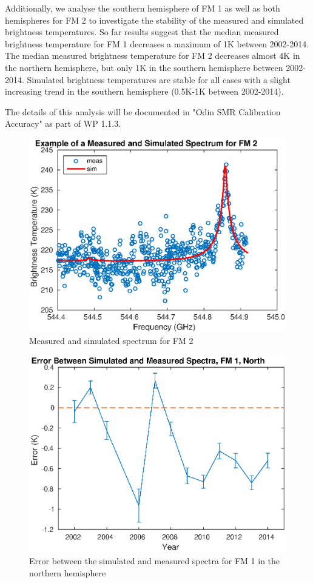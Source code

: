 \begin{itemize}
Additionally, we analyse the southern hemisphere of FM 1 as well as both hemispheres for FM 2 to investigate the stability of the measured and simulated brightness temperatures. So far results suggest that the median measured brightness temperature for FM 1 decreases a maximum of 1K between 2002-2014. The median measured brightness temperature for FM 2 decreases almost 4K in the northern hemisphere, but only 1K in the southern hemisphere between 2002-2014. Simulated brightness temperatures are stable for all cases with a slight increasing trend in the southern hemisphere (0.5K-1K between 2002-2014). 

The details of this analysis will be documented in "Odin SMR Calibration Accuracy" as part of WP 1.1.3.

\begin{figure}[b]
\centering
\includegraphics[scale = 0.7]{figures/fm2.eps}
\caption{Measured and simulated spectrum for FM 2}
\label{fig:Measured_simulated}
\end{figure}


\begin{figure}[t]
\centering
\includegraphics[scale = 0.8]{figures/Error_fm1_n.eps}
\caption{Error between the simulated and measured spectra for FM 1 in the northern hemisphere}
\label{fig:Error}
\end{figure}



\end{itemize}

